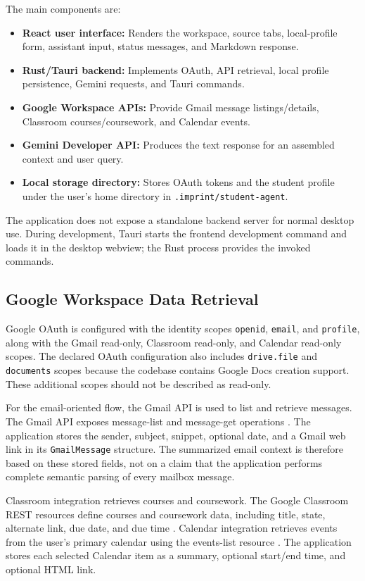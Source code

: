 \documentclass[conference]{IEEEtran}
\begin{document}
The main components are:

\begin{itemize}
    \item \textbf{React user interface:} Renders the workspace, source tabs, local-profile form, assistant input, status messages, and Markdown response.
    \item \textbf{Rust/Tauri backend:} Implements OAuth, API retrieval, local profile persistence, Gemini requests, and Tauri commands.
    \item \textbf{Google Workspace APIs:} Provide Gmail message listings/details, Classroom courses/coursework, and Calendar events.
    \item \textbf{Gemini Developer API:} Produces the text response for an assembled context and user query.
    \item \textbf{Local storage directory:} Stores OAuth tokens and the student profile under the user's home directory in \texttt{.imprint/student-agent}.
\end{itemize}

The application does not expose a standalone backend server for normal desktop use. During development, Tauri starts the frontend development command and loads it in the desktop webview; the Rust process provides the invoked commands.

\subsection{Google Workspace Data Retrieval}

Google OAuth is configured with the identity scopes \texttt{openid}, \texttt{email}, and \texttt{profile}, along with the Gmail read-only, Classroom read-only, and Calendar read-only scopes. The declared OAuth configuration also includes \texttt{drive.file} and \texttt{documents} scopes because the codebase contains Google Docs creation support. These additional scopes should not be described as read-only.

For the email-oriented flow, the Gmail API is used to list and retrieve messages. The Gmail API exposes message-list and message-get operations \cite{gmail_api}. The application stores the sender, subject, snippet, optional date, and a Gmail web link in its \texttt{GmailMessage} structure. The summarized email context is therefore based on these stored fields, not on a claim that the application performs complete semantic parsing of every mailbox message.

Classroom integration retrieves courses and coursework. The Google Classroom REST resources define courses and coursework data, including title, state, alternate link, due date, and due time \cite{classroom_coursework}. Calendar integration retrieves events from the user's primary calendar using the events-list resource \cite{calendar_events}. The application stores each selected Calendar item as a summary, optional start/end time, and optional HTML link.
\end{document}
